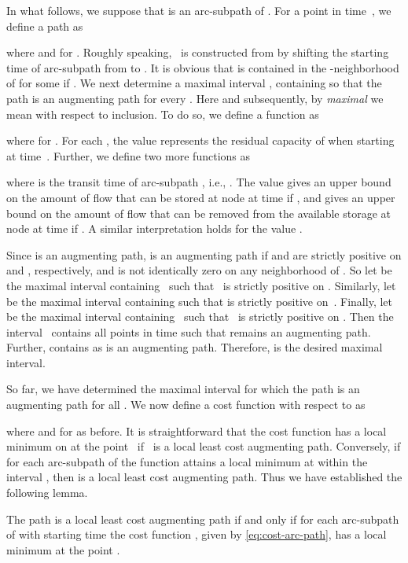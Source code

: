 \documentclass{svjour3}                     \smartqed
\begin{document}
In what follows, we suppose that  is an arc-subpath of . For a point in time~, we define a path  as

where  and  for . Roughly speaking,~ is constructed from  by shifting the starting time of arc-subpath  from  to . 
It is obvious that  is contained in the -neighborhood of  for some  if 
. 
We next determine a maximal interval , containing  so that the path  is an augmenting path for every .  Here and subsequently, by \emph{maximal} we mean with respect to inclusion. To do so, we define a function  as

where  for . For each , the value  represents the residual capacity of  when starting at time~. Further, we define two more functions  as

where  is the transit time of arc-subpath , i.e., . The value  gives an upper bound on the amount of flow that can be stored at node  at time  if , and gives an upper bound on the amount of flow that can be removed from the available storage at node  at time  if  .  A similar interpretation holds for the value .





Since  is an augmenting path,  is an augmenting path if  and  are strictly positive on  and  , respectively, and  is not identically zero on any neighborhood of . So let  be the maximal interval containing~ such that~ is strictly positive on . Similarly, let  be the maximal interval containing  such that  is strictly positive on~. Finally, let   be the maximal interval containing~ such that~ is strictly positive on . Then the interval~ contains all points in time  such that  remains an augmenting path. Further,  contains  as  is an augmenting path. Therefore,  is the desired maximal interval.


So far, we have determined the maximal interval  for which the path  is an augmenting path for all . We now define a cost function  with respect to  as

where  and  for  as before. It is straightforward that the cost function  has a local minimum on  at the point~ if~ is a local least cost augmenting path. Conversely, if for each arc-subpath  of  the function  attains a local minimum at  within the interval , then  is a local least cost augmenting path. Thus we have established the following lemma. 


\begin{lemma}
\label{lem:local-path}
The path  is a local least cost augmenting path if and only if for each arc-subpath  of  with starting time  the cost function , given by \eqref{eq:cost-arc-path}, has a local minimum at the point .
\end{lemma}
\end{document}
